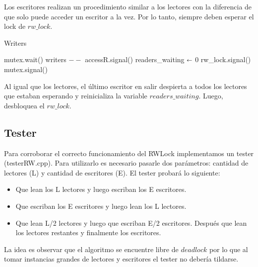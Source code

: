 Los escritores realizan un procedimiento similar a los lectores con la diferencia de que solo puede acceder un escritor a la vez. Por lo tanto, siempre deben esperar el lock de $rw\_lock$.

\begin{algorithm}[H]
\caption{Writers}\label{ej1}
\begin{algorithmic}[1]
	\State mutex.wait()
	\State writers $--$
				\State accessR.signal()
			\EndFor
			\State readers\_waiting $\shortleftarrow$ 0
		\EndIf
	\EndIf
	\State rw\_lock.signal()
	\State mutex.signal()
\EndProcedure
\end{algorithmic}
\end{algorithm}

Al igual que los lectores, el último escritor en salir despierta a todos los lectores que estaban esperando y reinicializa la variable $readers\_waiting$. Luego, desbloquea el $rw\_lock$.

\subsection{Tester}

Para corroborar el correcto funcionamiento del RWLock implementamos un tester (testerRW.cpp). Para utilizarlo es necesario pasarle dos parámetros: cantidad de lectores (L) y cantidad de escritores (E). El tester probará lo siguiente:

\begin{itemize}
	\item Que lean los L lectores y luego escriban los E escritores.
	\item Que escriban los E escritores y luego lean los L lectores.
	\item Que lean L/2 lectores y luego que escriban E/2 escritores. Después que lean los lectores restantes y finalmente los escritores.
\end{itemize}

La idea es observar que el algoritmo se encuentre libre de $deadlock$ por lo que al tomar instancias grandes de lectores y escritores el tester no debería tildarse.




